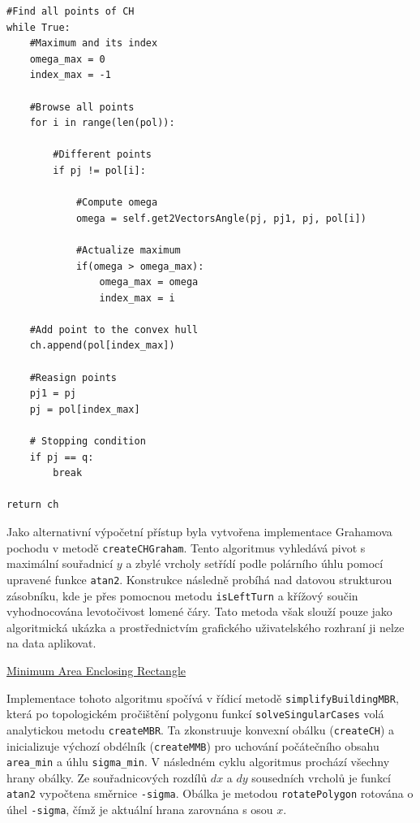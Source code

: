 \documentclass[12pt]{article}
\begin{document}
\begin{lstlisting}[caption={Hlavní smyčka algoritmu Jarvis Scan}]
#Find all points of CH
while True:
    #Maximum and its index
    omega_max = 0
    index_max = -1
    
    #Browse all points
    for i in range(len(pol)):
        
        #Different points
        if pj != pol[i]:
            
            #Compute omega
            omega = self.get2VectorsAngle(pj, pj1, pj, pol[i])
    
            #Actualize maximum
            if(omega > omega_max):
                omega_max = omega
                index_max = i
            
    #Add point to the convex hull
    ch.append(pol[index_max])
    
    #Reasign points
    pj1 = pj
    pj = pol[index_max]
    
    # Stopping condition
    if pj == q:
        break
    
return ch
\end{lstlisting}

\newpage

Jako alternativní výpočetní přístup byla vytvořena implementace Grahamova pochodu v metodě \texttt{createCHGraham}. Tento algoritmus vyhledává pivot s maximální souřadnicí $y$ a zbylé vrcholy setřídí podle polárního úhlu pomocí upravené funkce \texttt{atan2}. Konstrukce následně probíhá nad datovou strukturou zásobníku, kde je přes pomocnou metodu \texttt{isLeftTurn} a křížový součin vyhodnocována levotočivost lomené čáry. Tato metoda však slouží pouze jako algoritmická ukázka a prostřednictvím grafického uživatelského rozhraní ji nelze na data aplikovat.

\underline{Minimum Area Enclosing Rectangle}

Implementace tohoto algoritmu spočívá v řídicí metodě \texttt{simplifyBuildingMBR}, která po topologickém pročištění polygonu funkcí \texttt{solveSingularCases} volá analytickou metodu \texttt{createMBR}. Ta zkonstruuje konvexní obálku (\texttt{createCH}) a inicializuje výchozí obdélník (\texttt{createMMB}) pro uchování počátečního obsahu \texttt{area\_min} a úhlu \texttt{sigma\_min}. V následném cyklu algoritmus prochází všechny hrany obálky. Ze souřadnicových rozdílů $dx$ a $dy$ sousedních vrcholů je funkcí \texttt{atan2} vypočtena směrnice \texttt{-sigma}. Obálka je metodou \texttt{rotatePolygon} rotována o úhel \texttt{-sigma}, čímž je aktuální hrana zarovnána s osou $x$.
\end{document}
